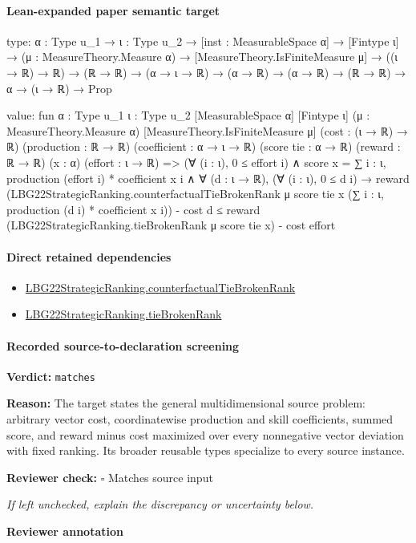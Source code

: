 \documentclass[10pt]{article}
\newcommand{\reviewerbox}{%
  \par\noindent\fbox{\parbox{0.96\linewidth}{\rule{0pt}{0.38in}}}\par
}
\newcommand{\reviewmatch}[1]{%
  \par\noindent\textbf{Reviewer check:} $\square$\; #1\par
  \noindent\emph{If left unchecked, explain the discrepancy or uncertainty below.}\par
}
\begin{document}
\paragraph{Lean-expanded paper semantic target}
\begin{ReviewVerbatim}
type:
{α : Type u_1} →
  {ι : Type u_2} →
    [inst : MeasurableSpace α] →
      [Fintype ι] →
        (μ : MeasureTheory.Measure α) →
          [MeasureTheory.IsFiniteMeasure μ] →
            ((ι → ℝ) → ℝ) → (ℝ → ℝ) → (α → ι → ℝ) → (α → ℝ) → (α → ℝ) → (ℝ → ℝ) → α → (ι → ℝ) → Prop

value:
fun {α : Type u_1} {ι : Type u_2} [MeasurableSpace α] [Fintype ι] (μ : MeasureTheory.Measure α)
    [MeasureTheory.IsFiniteMeasure μ] (cost : (ι → ℝ) → ℝ) (production : ℝ → ℝ) (coefficient : α → ι → ℝ)
    (score tie : α → ℝ) (reward : ℝ → ℝ) (x : α) (effort : ι → ℝ) =>
  (∀ (i : ι), 0 ≤ effort i) ∧
    score x = ∑ i : ι, production (effort i) * coefficient x i ∧
      ∀ (d : ι → ℝ),
        (∀ (i : ι), 0 ≤ d i) →
          reward
                (LBG22StrategicRanking.counterfactualTieBrokenRank μ score tie x
                  (∑ i : ι, production (d i) * coefficient x i)) -
              cost d ≤
            reward (LBG22StrategicRanking.tieBrokenRank μ score tie x) - cost effort
\end{ReviewVerbatim}

\paragraph{Direct retained dependencies}
\begin{itemize}\raggedright
\item \hyperlink{paper-prerequisite-6ed45e46d01eadeb}{LBG22\allowbreak{}Strategic\allowbreak{}Ranking.\allowbreak{}counterfactual\allowbreak{}Tie\allowbreak{}Broken\allowbreak{}Rank}
\item \hyperlink{paper-prerequisite-b7c71e53177b76c6}{LBG22\allowbreak{}Strategic\allowbreak{}Ranking.\allowbreak{}tie\allowbreak{}Broken\allowbreak{}Rank}
\end{itemize}
\paragraph{Recorded source-to-declaration screening}
\textbf{Verdict:} \texttt{matches}
\\
{\raggedright
\textbf{Reason:} The target states the general multidimensional source problem:\allowbreak{} arbitrary vector cost, coordinatewise production and skill coefficients, summed score, and reward minus cost maximized over every nonnegative vector deviation with fixed ranking.\allowbreak{} Its broader reusable types specialize to every source instance.\allowbreak{}
\par}
\reviewmatch{Matches source input}
\noindent\textbf{Reviewer annotation}\par
\reviewerbox
\clearpage
\hypertarget{paper-prerequisite-6f1ee9b200124096}{}
\end{document}
